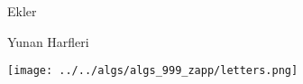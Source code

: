 \documentclass[12pt,fleqn]{article}\usepackage{../../common}
\begin{document}
Ekler

Yunan Harfleri

\texttt{[image: ../../algs/algs\_999\_zapp/letters.png]}
\end{document}
